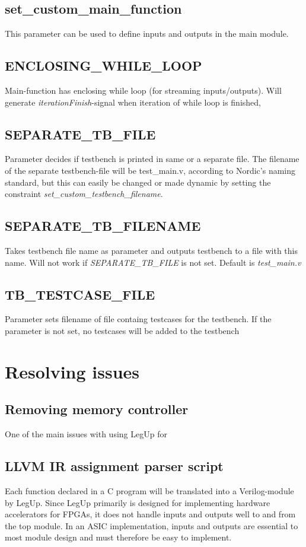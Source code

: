 \subsection{set\_custom\_main\_function}
This parameter can be used to define inputs and outputs in the main module. 
\subsection{ENCLOSING\_WHILE\_LOOP}
Main-function has enclosing while loop (for streaming inputs/outputs). Will generate \textit{iterationFinish}-signal when iteration of while loop is finished,
\subsection{SEPARATE\_TB\_FILE}
Parameter decides if testbench is printed in same or a separate file. The filename of the separate testbench-file will be test\_main.v, according to Nordic's naming standard, but this can easily be changed or made dynamic by setting the constraint \textit{set\_custom\_testbench\_filename}.
\subsection{SEPARATE\_TB\_FILENAME}
Takes testbench file name as parameter and outputs testbench to a file with this name. Will not work if \textit{SEPARATE\_TB\_FILE} is not set. Default is \textit{test\_main.v}
\subsection{TB\_TESTCASE\_FILE}
Parameter sets filename of file containg testcases for the testbench. If the parameter is not set, no testcases will be added to the testbench

\section{Resolving issues}

\subsection{Removing memory controller}
One of the main issues with using LegUp for 
\subsection{LLVM IR assignment parser script}
Each function declared in a C program will be translated into a Verilog-module by LegUp. Since LegUp primarily is designed for implementing hardware accelerators for FPGAs, it does not handle inputs and outputs well to and from the top module. In an ASIC implementation, inputs and outputs are essential to most module design and must therefore be easy to implement.
